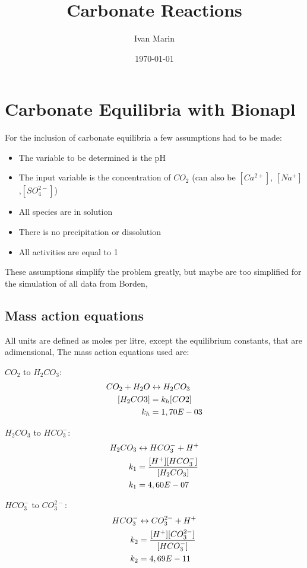 \documentclass[11pt,a4paper,twoside]{report}
\title{Carbonate Reactions}
\author{Ivan Marin}
\date{\today}
\begin{document}
\maketitle
\tableofcontents
\newpage

\chapter{Carbonate Equilibria with Bionapl}
For the inclusion of carbonate equilibria a few assumptions had to be made:
\begin{itemize}
\item The variable to be determined is the pH
\item The input variable is the concentration of $CO_{2}$ (can also be $[Ca^{2+}]$, $[Na^{+}]$,$[SO_{4}^{2-}]$)
\item All species are in solution
\item There is no precipitation or dissolution
\item All activities are equal to 1
\end{itemize}

These assumptions simplify the problem greatly, but maybe are too simplified for the simulation of all data from Borden,

\section{Mass action equations}
All units are defined as moles per litre, except the equilibrium constants, that are adimensional, The mass action equations used are:

$CO_{2}$ to $H_{2}CO_{3}$:
\begin{align}\label{co2}
CO_{2} + H_{2}O &\leftrightarrow  H_{2}CO_{3} \\ \notag
[H_{2}CO3]      &= k_{h}[CO2] \\ \notag
k_{h}           &= 1,70E-03
\end{align}

$H_{2}CO_{3}$ to $HCO_{3}^{-}$:
\begin{align}\label{hco3}
H_{2}CO_{3} &\leftrightarrow  HCO_{3}^{-} + H^{+} \\ \notag
k_{1}       &= \frac{[H^{+}][HCO_{3}^{-}]}{[H_{2}CO_{3}]} \\ \notag
k_{1}       &= 4,60E-07
\end{align}

$HCO_{3}^{-}$ to $CO_{3}^{2-}$:
\begin{align}\label{co3}
HCO_{3}^{-} &\leftrightarrow  CO_{3}^{2-} + H^{+} \\ \notag
k_{2}       &= \frac{[H^{+}][CO_{3}^{2-}]}{[HCO_{3}^{-}]} \\ \notag
k_{2}       &= 4,69E-11
\end{align}
\end{document}

